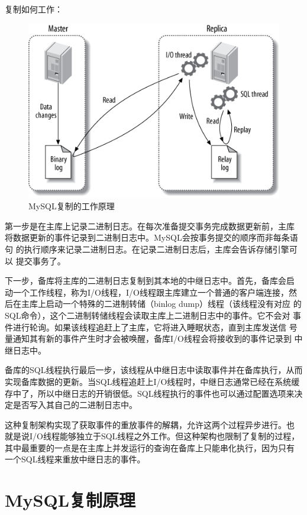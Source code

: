 复制如何工作：
\begin{figure}[!h]
\centering
\includegraphics{img/mysql_replication_works}
\caption{MySQL复制的工作原理}
\label{fig:mysqlReplicationWorks}
\end{figure}

第一步是在主库上记录二进制日志。在每次准备提交事务完成数据更新前，主库
将数据更新的事件记录到二进制日志中。MySQL会按事务提交的顺序而非每条语句
的执行顺序来记录二进制日志。在记录二进制日志后，主库会告诉存储引擎可以
提交事务了。

下一步，备库将主库的二进制日志复制到其本地的中继日志中。首先，备库会启
动一个工作线程，称为I/O线程，I/O线程跟主库建立一个普通的客户端连接，然
后在主库上启动一个特殊的二进制转储（binlog dump）线程（该线程没有对应
的SQL命令），这个二进制转储线程会读取主库上二进制日志中的事件。它不会对
事件进行轮询。如果该线程追赶上了主库，它将进入睡眠状态，直到主库发送信
号量通知其有新的事件产生时才会被唤醒，备库I/O线程会将接收到的事件记录到
中继日志中。

备库的SQL线程执行最后一步，该线程从中继日志中读取事件并在备库执行，从而
实现备库数据的更新。当SQL线程追赶上I/O线程时，中继日志通常已经在系统缓
存中了，所以中继日志的开销很低。SQL线程执行的事件也可以通过配置选项来决
定是否写入其自己的二进制日志中。

这种复制架构实现了获取事件的重放事件的解耦，允许这两个过程异步进行。也
就是说I/O线程能够独立于SQL线程之外工作。但这种架构也限制了复制的过程，
其中最重要的一点是在主库上并发运行的查询在备库上只能串化执行，因为只有
一个SQL线程来重放中继日志的事件。

\section{MySQL复制原理}

